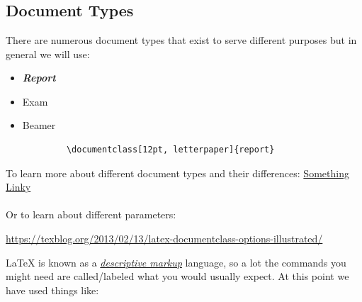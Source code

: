 \documentclass[12pt, letterpaper]{report}
\newcommand{\0}{\emptyset}
\theoremstyle{theorem}
\theoremstyle{definition}
\theoremstyle{definition}
\theoremstyle{definition}
\theoremstyle{definition}
\theoremstyle{theorem}
\theoremstyle{theorem}
\theoremstyle{remark}
\begin{document}
\chapter{}

\section{Document Types}

There are numerous document types that exist to serve different purposes but in general we will use:

	\begin{itemize}
		\item \textbf{\emph{Report}}
		\item Exam
		\item Beamer
	\end{itemize}
	
	\begin{lstlisting}
			\documentclass[12pt, letterpaper]{report}
	\end{lstlisting}
	
	To learn more about different document types and their differences:  \href{http://www.overleaf.com}{Something Linky} \\ \\ 
	Or to learn about different parameters: 
	
	\url{https://texblog.org/2013/02/13/latex-documentclass-options-illustrated/}
	
\LaTeX \; is known as a \href{https://en.wikipedia.org/wiki/Markup_language#Descriptive_markup}{\emph{descriptive markup}} language, so a lot the commands you might need are called/labeled what you would usually expect.  At this point we have used things like:
\end{document}
